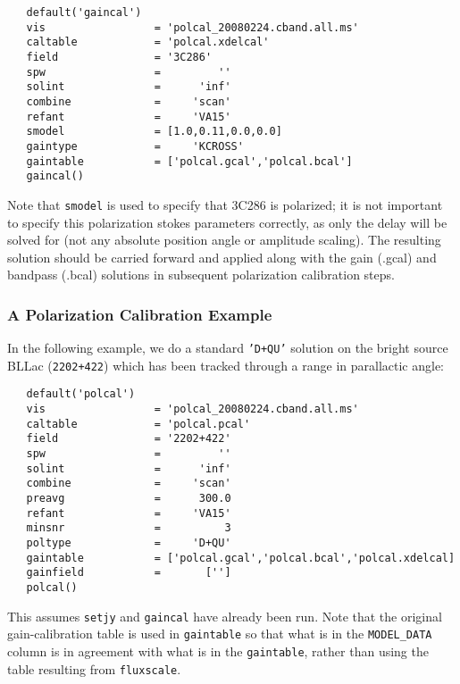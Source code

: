 \small
\begin{verbatim}
   default('gaincal')
   vis                 = 'polcal_20080224.cband.all.ms'
   caltable            = 'polcal.xdelcal'
   field               = '3C286'        
   spw                 =         ''        
   solint              =      'inf'    
   combine             =     'scan' 
   refant              =     'VA15'
   smodel              = [1.0,0.11,0.0,0.0]        
   gaintype            =     'KCROSS'        
   gaintable           = ['polcal.gcal','polcal.bcal']
   gaincal()
\end{verbatim}
\normalsize

Note that {\tt smodel} is used to specify that 3C286 is polarized; it is not
important to specify this polarization stokes parameters correctly, as only 
the delay will be solved for (not any absolute position angle or amplitude 
scaling).  The resulting solution should be carried forward and applied 
along with the gain (.gcal) and
bandpass (.bcal) solutions in subsequent polarization calibration steps.


\subsubsection{A Polarization Calibration Example}
\label{section:cal.solve.pol.example}

In the following example, we do a standard {\tt 'D+QU'} solution on
the bright source BLLac ({\tt 2202+422}) which has been tracked
through a range in parallactic angle:
\small
\begin{verbatim}
   default('polcal')
   vis                 = 'polcal_20080224.cband.all.ms'
   caltable            = 'polcal.pcal'
   field               = '2202+422'        
   spw                 =         ''        
   solint              =      'inf'    
   combine             =     'scan' 
   preavg              =      300.0        
   refant              =     'VA15'        
   minsnr              =          3        
   poltype             =     'D+QU'        
   gaintable           = ['polcal.gcal','polcal.bcal','polcal.xdelcal]
   gainfield           =       ['']
   polcal()
\end{verbatim}
\normalsize
This assumes {\tt setjy} and {\tt gaincal} have already been run. 
Note that the original gain-calibration table is used in {\tt gaintable}
so that what is in the {\tt MODEL\_DATA} column is in agreement with
what is in the {\tt gaintable}, rather than using the table resulting
from {\tt fluxscale}.

